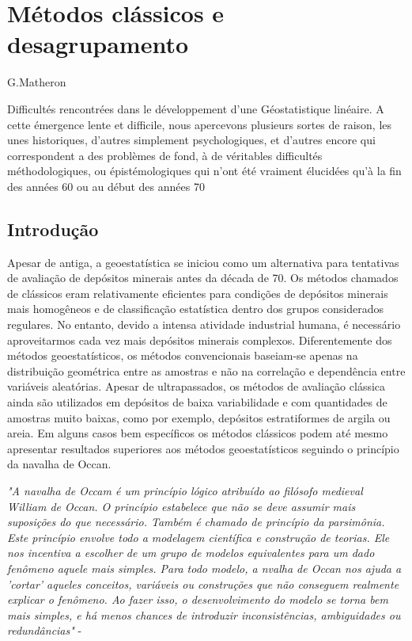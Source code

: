 \chapter{Métodos clássicos e desagrupamento} \label{Cap_4}

\begin{myquoting}{G.Matheron}
	
	Difficultés rencontrées dans le développement d'une Géostatistique linéaire. A cette émergence lente et difficile, nous apercevons plusieurs sortes de raison, les unes historiques, d'autres simplement psychologiques, et d'autres encore qui correspondent a des problèmes de fond, à de véritables difficultés méthodologiques, ou épistémologiques qui n'ont été vraiment élucidées qu'à la fin des années 60 ou au début des années 70
\end{myquoting}

\section{Introdução} 

Apesar de antiga, a geoestatística se iniciou como um alternativa para tentativas de avaliação de depósitos minerais antes da década de 70. Os métodos chamados de clássicos eram relativamente eficientes para condições de depósitos minerais mais homogêneos e de classificação estatística dentro dos grupos considerados regulares. No entanto, devido a intensa atividade industrial humana, é necessário aproveitarmos cada vez mais depósitos minerais complexos. Diferentemente dos métodos geoestatísticos, os métodos convencionais baseiam-se apenas na distribuição geométrica entre as amostras e não na correlação e dependência entre variáveis aleatórias. Apesar de ultrapassados, os métodos de avaliação clássica ainda são utilizados em depósitos de baixa variabilidade e com quantidades de amostras muito baixas, como por exemplo, depósitos estratiformes de argila ou areia. Em alguns casos bem específicos os métodos clássicos podem até mesmo apresentar resultados superiores aos métodos geoestatísticos seguindo o princípio da navalha de Occan. 

\begin{definition}
	\textit{"A navalha de Occam é um princípio lógico atribuído ao filósofo medieval William de Occan. O princípio estabelece que não se deve assumir mais suposições do que necessário. Também é chamado de princípio da parsimônia. Este princípio envolve todo a modelagem científica e construção de teorias. Ele nos incentiva a escolher de um grupo de modelos equivalentes para um dado fenômeno aquele mais simples. Para todo modelo, a nvalha de Occan nos ajuda a 'cortar' aqueles conceitos, variáveis ou construções que não conseguem realmente explicar o fenômeno. Ao fazer isso, o desenvolvimento do modelo se torna bem mais simples, e há menos chances de introduzir inconsistências, ambiguidades ou redundâncias"} -\cite{heylighen1997occam} 

\end{definition} 

